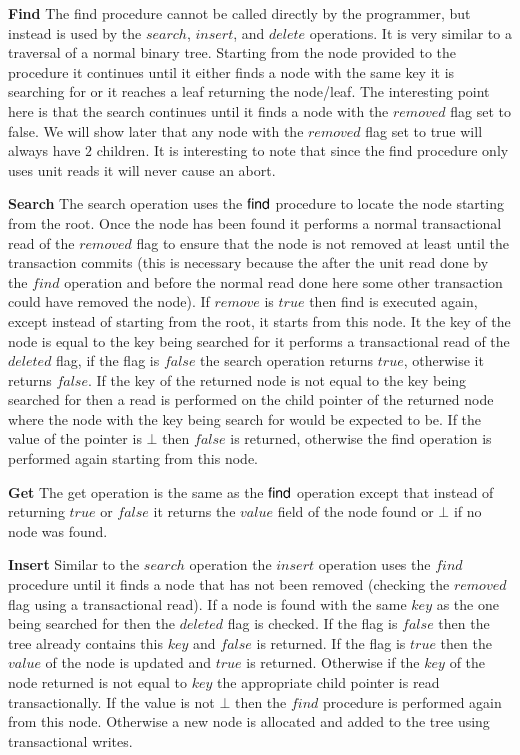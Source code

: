 \documentclass[10pt]{sigplanconf}
\begin{document}
{\bf Find} The find procedure cannot be called directly by the programmer, but instead is used by the $search$, $insert$, and $delete$ operations.
It is very similar to a traversal of a normal binary tree.
Starting from the node provided to the procedure it continues until it either finds a node with the same key it is searching for or it reaches a leaf returning the node/leaf.
The interesting point here is that the search continues until it finds a node with the $removed$ flag set to false.
We will show later that any node with the $removed$ flag set to true will always have $2$ children.
It is interesting to note that since the find procedure only uses unit reads it will never cause an abort.

{\bf Search} The search operation uses the ${\sf find}$ procedure to locate the node starting from the root.
Once the node has been found it performs a normal transactional read of the $removed$ flag to ensure that the node is not removed at least until the transaction commits (this is necessary because the after the unit read done by the $find$ operation and before the normal read done here some other transaction could have removed the node).
If $remove$ is $true$ then find is executed again, except instead of starting from the root, it starts from this node.
It the key of the node is equal to the key being searched for it performs a transactional read of the $deleted$ flag, if the flag is $false$ the search operation returns $true$, otherwise it returns $false$.
If the key of the returned node is not equal to the key being searched for then a read is performed on the child pointer of the returned node where the node with the key being search for would be expected to be.
If the value of the pointer is $\bot$ then $false$ is returned, otherwise the find operation is performed again starting from this node.

{\bf Get} The get operation is the same as the ${\sf find}$ operation except that instead of returning $true$ or $false$ it returns the $value$ field of the node found or $\bot$ if no node was found.

{\bf Insert} Similar to the $search$ operation the $insert$ operation uses the $find$ procedure until it finds a node that has not been removed (checking the $removed$ flag using a transactional read).
If a node is found with the same $key$ as the one being searched for then the $deleted$ flag is checked.
If the flag is $false$ then the tree already contains this $key$ and $false$ is returned.
If the flag is $true$ then the $value$ of the node is updated and $true$ is returned.
Otherwise if the $key$ of the node returned is not equal to $key$ the appropriate child pointer is read transactionally.
If the value is not $\bot$ then the $find$ procedure is performed again from this node.
Otherwise a new node is allocated and added to the tree using transactional writes.
\end{document}
